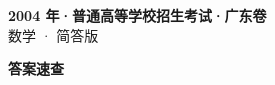 \documentclass[zihao=-4, a4paper]{ctexart}
\begin{document}
\begin{center}
  {\Large\bfseries 2004 年·普通高等学校招生考试·广东卷}\\[4pt]
  {\large 数学 · 简答版}
\end{center}
\medskip
{}

\clearpage
{}
\begin{center}{\Large\bfseries 答案速查}\end{center}
\medskip

\end{document}
